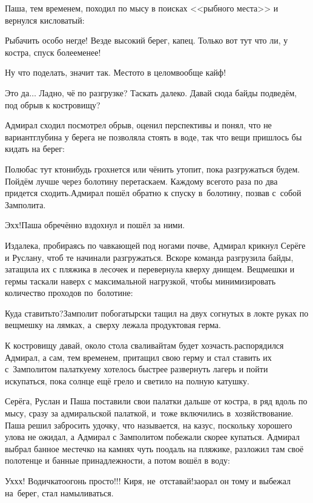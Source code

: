Паша, тем временем, походил по мысу в поисках <<рыбного места>> и вернулся кисловатый:

\diagdash Рыбачить особо негде! Везде высокий берег, капец. Только вот тут что ли, у костра, спуск более\sdash менее!

\diagdash Ну что поделать, значит так. Место\sdash то в целом\mdash вообще кайф!

\diagdash Это да$\ldots$ Ладно, чё по разгрузке? Таскать далеко. Давай сюда байды подведём, под обрыв к костровищу? 

Адмирал сходил посмотрел обрыв, оценил перспективы и понял, что не вариант\mdash глубина у берега не позволяла стоять в воде, так что вещи пришлось бы кидать на берег:

\diagdash Полюбас тут кто\sdash нибудь грохнется или чё\sdash нить утопит, пока разгружаться будем. Пойдём лучше через болотину перетаскаем. Каждому всего\sdash то раза по два придется сходить.\mdash Адмирал пошёл обратно к спуску в~болотину, позвав с~собой Замполита.

\diagdash Эх\sdash х!\mdash Паша обречённо вздохнул и пошёл за ними.

Издалека, пробираясь по чавкающей под ногами почве, Адмирал крикнул Серёге и Руслану, чтоб те начинали разгружаться. Вскоре команда разгрузила байды, затащила их с пляжика в лесочек и перевернула кверху днищем. Вещмешки и гермы таскали наверх с максимальной нагрузкой, чтобы минимизировать количество проходов по~болотине: 

\diagdash Куда ставить\sdash то?\mdash Замполит по\sdash богатырски тащил на двух согнутых в локте руках по вещмешку на лямках, а~сверху лежала продуктовая герма.

\diagdash К костровищу давай, около стола сваливай\mdash там будет хозчасть.\mdash распорядился Адмирал, а сам, тем временем, притащил свою герму и стал ставить их с~Замполитом палатку\mdash ему хотелось быстрее развернуть лагерь и пойти искупаться, пока солнце ещё грело и светило на полную катушку.

Серёга, Руслан и Паша поставили свои палатки дальше от костра, в ряд вдоль по мысу, сразу за адмиральской палаткой, и~тоже включились в~хозяйствование. Паша решил забросить удочку, что называется, на казус, поскольку хорошего улова не ожидал, а Адмирал с Замполитом побежали скорее купаться. Адмирал выбрал банное местечко на камнях чуть поодаль на пляжике, разложил там своё полотенце и банные принадлежности, а потом вошёл в воду: 

\diagdash Ух\sdash х\sdash х! Водичка\sdash то\mdash огонь просто!!! Киря, не~отставай!\mdash заорал он тому и выбежал на~берег, стал намыливаться.

